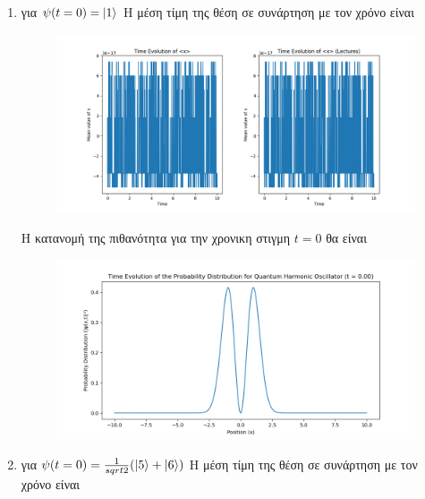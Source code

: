 \documentclass[12pt]{article}
\begin{document}
    \section*{{}}
\begin{enumerate}
    \item για $\psi(t=0) = \ket{1}$
        Η μέση τίμη της θέση σε συνάρτηση με τον χρόνο είναι
        \begin{figure}[H]

            \centering
            \includegraphics[scale = 0.6]{Figure_2.png}\\ 
        \end{figure}
        Η κατανομή της πιθανότητα για την χρονικη στιγμη $t=0$ θα είναι
        \begin{figure}[H]

            \centering
            \includegraphics[scale = 0.4]{a9f29996c98e4dbf90e190930b368a61R99Q4ZKhAa9Fk3jX-0.png}\\ 
        \end{figure}
        \item για $\psi(t=0) = \frac{1}{sqrt{2}}(\ket{5}+\ket{6})$
        Η μέση τίμη της θέση σε συνάρτηση με τον χρόνο είναι
        \begin{figure}[H]


\end{figure}
\end{enumerate}
\end{document}
